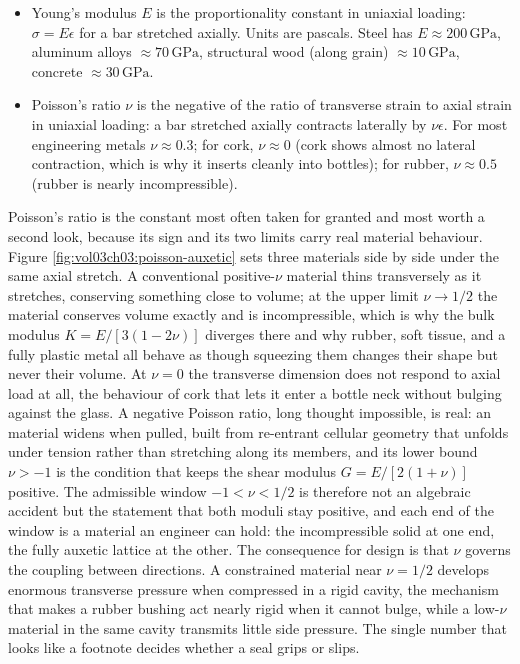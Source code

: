 \begin{itemize}[leftmargin=*]
  \item Young's modulus $E$ is the proportionality constant in
    uniaxial loading: $\sigma = E \epsilon$ for a bar stretched
    axially. Units are pascals. Steel has $E \approx 200\,\text{GPa}$,
    aluminum alloys $\approx 70\,\text{GPa}$, structural wood (along
    grain) $\approx 10\,\text{GPa}$, concrete $\approx 30\,\text{GPa}$.
  \item Poisson's ratio $\nu$ is the negative of the ratio of
    transverse strain to axial strain in uniaxial loading: a bar
    stretched axially contracts laterally by $\nu \epsilon$. For most
    engineering metals $\nu \approx 0.3$; for cork, $\nu \approx 0$
    (cork shows almost no lateral contraction, which is why it
    inserts cleanly into bottles); for rubber, $\nu \approx 0.5$
    (rubber is nearly incompressible).
\end{itemize}

Poisson's ratio is the constant most often taken for granted and most
worth a second look, because its sign and its two limits carry real
material behaviour. Figure \ref{fig:vol03ch03:poisson-auxetic} sets three
materials side by side under the same axial stretch. A conventional
positive-$\nu$ material thins transversely as it stretches, conserving
something close to volume; at the upper limit $\nu \to 1/2$ the material
conserves volume exactly and is incompressible, which is why the bulk
modulus $K = E/[3(1-2\nu)]$ diverges there and why rubber, soft tissue,
and a fully plastic metal all behave as though squeezing them changes
their shape but never their volume. At $\nu = 0$ the transverse dimension
does not respond to axial load at all, the behaviour of cork that lets it
enter a bottle neck without bulging against the glass. A negative Poisson
ratio, long thought impossible, is real: an  material
widens when pulled, built from re-entrant cellular geometry that unfolds
under tension rather than stretching along its members, and its lower
bound $\nu > -1$ is the condition that keeps the shear modulus $G =
E/[2(1+\nu)]$ positive. The admissible window $-1 < \nu < 1/2$ is
therefore not an algebraic accident but the statement that both moduli
stay positive, and each end of the window is a material an engineer can
hold: the incompressible solid at one end, the fully auxetic lattice at
the other. The consequence for design is that $\nu$ governs the coupling
between directions. A constrained material near $\nu = 1/2$ develops
enormous transverse pressure when compressed in a rigid cavity, the
mechanism that makes a rubber bushing act nearly rigid when it cannot
bulge, while a low-$\nu$ material in the same cavity transmits little side
pressure. The single number that looks like a footnote decides whether a
seal grips or slips.

